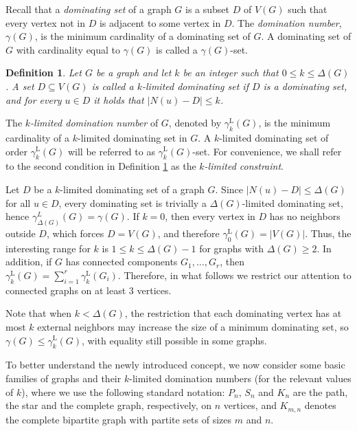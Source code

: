 \documentclass[11pt]{article}
\newtheorem{definition}[theorem]{Definition}
\newcommand{\gammakL}{\gamma_k^{\mathrm L}}
\begin{document}
Recall that a \textit{dominating set} of a graph $G$ is a subset $D$ of $V(G)$ such that every vertex not in $D$ is adjacent to some vertex in $D$. The \textit{domination number}, $\gamma(G)$, is the minimum cardinality of a dominating set of $G$. A dominating set of $G$ with cardinality equal to $\gamma(G)$ is called a $\gamma(G)$-set.




\begin{definition}
\label{gldef}
Let $G$ be a graph and let $k$ be an integer such that $0\leq k \le \Delta(G)$.  
A set $D \subseteq V(G)$ is called a \emph{$k$-limited dominating set} if $D$ is a dominating set, and
for every $u \in D$ it holds that $|N(u)-D| \le k$.
\end{definition}

The \emph{$k$-limited domination number} of $G$, denoted by $\gammakL(G)$, is the minimum cardinality of a $k$-limited dominating set in $G$. A $k$-limited dominating set of order $\gammakL(G)$ will be referred to as $\gammakL(G)$-set. For convenience, we shall refer to the second condition in  Definition \ref{gldef} as the \emph{$k$-limited constraint}.


Let $D$ be a $k$-limited dominating set of a graph $G$.
Since $|N(u)-D| \le \Delta(G)$ for all $u \in D$, every dominating set is trivially a $\Delta(G)$-limited dominating set, hence $\gamma_{\Delta(G)}^L(G) = \gamma(G)$.
If $k=0$, then every vertex in $D$ has no neighbors outside $D$, which forces $D = V(G)$, and therefore $\gamma_0^{\mathrm L}(G) = |V(G)|$.
Thus, the interesting range for $k$ is $1 \le k \le \Delta(G)-1$ for graphs with $\Delta(G) \ge 2$. 
In addition, if $G$ has connected components $G_1,\dots,G_r$, then
$\gammakL(G) = \sum_{i=1}^r \gammakL(G_i)$. Therefore, in what follows we restrict our attention to connected graphs on at least $3$ vertices.

Note that when $k<\Delta(G)$, the restriction that each dominating vertex has at most $k$ external neighbors may increase the size of a minimum dominating set, so $\gamma(G)\le \gamma^{\mathrm L}_k(G)$, with equality still possible in some graphs.


\medskip

To better understand the newly introduced concept, we now
consider some basic families of graphs and their 
$k$-limited domination numbers (for the relevant values of $k$), where we use the following standard notation: $P_n$, $S_n$ and $K_n$ are the path, the star and the complete graph, respectively, on $n$ vertices, and $K_{m,n}$ denotes the complete bipartite graph with 
partite sets of sizes $m$ and $n$.
\end{document}
